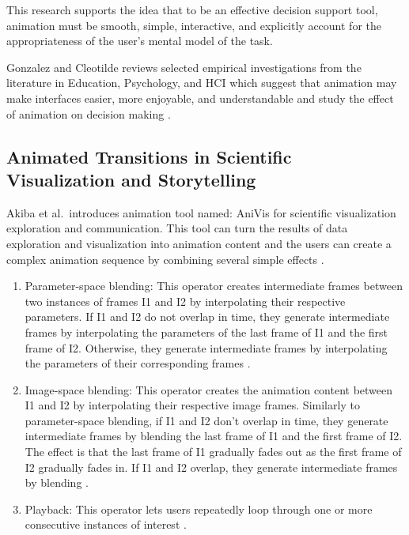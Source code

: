 \documentclass{egpubl}
\begin{document}
This research supports the idea that to be an effective decision support tool, animation must be smooth, simple, interactive, and explicitly account for the appropriateness of the user's mental model of the task.

Gonzalez and Cleotilde reviews selected empirical investigations from the literature in Education, Psychology, and HCI which suggest that animation may make interfaces easier, more enjoyable, and understandable and study the effect of animation on decision making \cite{gonzalez1996does}.


\subsection{Animated Transitions in Scientific Visualization and Storytelling}
Akiba et al.\ introduces animation tool named: AniVis for scientific visualization exploration and communication. This tool can turn the results of data exploration and visualization into animation content and the users can create a complex animation sequence by combining several simple effects \cite{Akiba}.
\begin{enumerate}
\item Parameter-space blending: This operator creates intermediate frames between two instances of frames I1 and I2 by interpolating their respective parameters. If I1 and I2 do not overlap in time, they generate intermediate frames by interpolating the parameters of the last frame of I1 and the first frame of I2. Otherwise, they generate intermediate frames by interpolating the parameters of their corresponding frames \cite{Akiba}.

\item Image-space blending: This operator creates the animation content between I1 and I2 by interpolating their respective image frames. Similarly to parameter-space blending, if I1 and I2 don't overlap in time, they generate intermediate frames by blending the last frame of I1 and the first frame of I2. The effect is that the last frame of I1 gradually fades out as the first frame of I2 gradually fades in. If I1 and I2 overlap, they generate intermediate frames by blending \cite{Akiba}.

\item Playback: This operator lets users repeatedly loop through one or more consecutive instances of interest \cite{Akiba}.

\end{enumerate}
\end{document}
